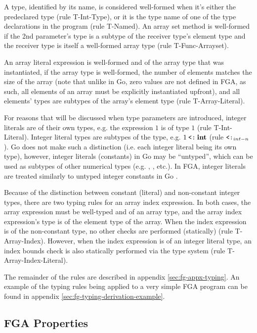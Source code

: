 A type, identified by its name, is considered well-formed when it's either the
predeclared  type (rule T-Int-Type), or it is the type name of one of
the type declarations in the program (rule T-Named). An array set method is
well-formed if the 2nd parameter's type is a subtype of the receiver type's
element type and the receiver type is itself a well-formed array type (rule
T-Func-Arrayset).

An array literal expression is well-formed and of the array type that was
instantiated, if the array type is well-formed, the number of elements matches
the size of the array (note that unlike in Go, zero values are not defined in
FGA, as such, all elements of an array must be explicitly instantiated upfront),
and all elements' types are subtypes of the array's element type (rule
T-Array-Literal).

For reasons that will be discussed when type parameters are introduced, integer
literals are of their own types, e.g. the expression $1$ is of type $1$ (rule
T-Int-Literal). Integer literal types are subtypes of the  type, e.g. $1
    \mathbin{\texttt{<:}} \texttt{\bf int}$ (rule $\mathbin{\texttt{<:}}_{int-n}$). Go does not make such a distinction (i.e.
each integer literal being its own type), however, integer literals (constants)
in Go may be ``untyped'', which can be used as subtypes of other numerical types
(e.g. , ,  etc.). In FGA, integer literals are
treated similarly to untyped integer constants in Go \autocite{spec}.

Because of the distinction between constant (literal) and non-constant integer
types, there are two typing rules for an array index expression. In both cases,
the array expression must be well-typed and of an array type, and the array
index expression's type is of the element type of the array. When the index
expression is of the non-constant  type, no other checks are performed
(statically) (rule T-Array-Index). However, when the index expression is of an
integer literal type, an index bounds check is also statically performed via the
type system (rule T-Array-Index-Literal).

The remainder of the rules are described in appendix \ref{sec:fg-appx-typing}.
An example of the typing rules being applied to a very simple FGA program can be
found in appendix \ref{sec:fg-typing-derivation-example}.




\subsection{FGA Properties}

